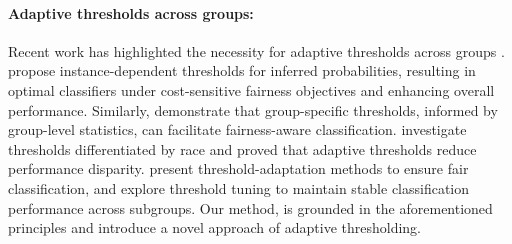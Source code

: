 \paragraph{Adaptive thresholds across groups:} Recent work has highlighted the necessity for adaptive thresholds across groups \cite{jang2022group,bakker2021beyond}. \citet{menon2018cost} propose instance-dependent thresholds for inferred probabilities, resulting in optimal classifiers under cost-sensitive fairness objectives and enhancing overall performance. Similarly, \citet{corbett2017algorithmic} demonstrate that group-specific thresholds, informed by group-level statistics, can facilitate fairness-aware classification. \citet{canetti2019soft} investigate thresholds differentiated by race and proved that adaptive thresholds reduce performance disparity. \citet{jang2022group} present threshold-adaptation methods to ensure fair classification, and \citet{bakker2021beyond} explore threshold tuning to maintain stable classification performance across subgroups. Our method, \textit{\name} is grounded in the aforementioned principles and introduce a novel approach of adaptive thresholding.




%